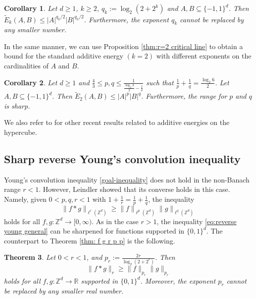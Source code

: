 \documentclass[reqno, 10pt]{amsart}
\theoremstyle{plain}
\numberwithin{equation}{section}
\newtheorem{theorem}{Theorem}[section]
\newtheorem{corollary}[theorem]{Corollary}
\theoremstyle{definition}
\newtheorem*{induction hypothesis}{Induction hypothesis}
\theoremstyle{remark}
\newcommand{\R}{\mathbb{R}}
\newcommand{\Z}{\mathbb{Z}}
\begin{document}
\begin{corollary}
    Let $d \geq 1$, $k \geq 2$, $q_k:=\log_2(2+2^k)$ and $A,B \subseteq \{-1,1\}^d$. Then $\widetilde{E}_k(A,B) \leq |A|^{q_k/2}|B|^{q_k/2}$. Furthermore, the exponent $q_k$ cannot be replaced by any smaller number.
\end{corollary}

In the same manner, we can use Proposition \ref{thm:r=2 critical line} to obtain a bound for the standard additive energy $(k=2)$ with different exponents on the cardinalities of $A$ and $B$.

\begin{corollary}\label{cor:additive k=2}
    Let $d \geq 1$ and $\frac{4}{3} \leq p, q \leq \frac{1}{\frac{\log_2 3}{2} - \frac{1}{4}}$ such that $\frac{1}{p}+\frac{1}{q}=\frac{\log_2 6}{2}$. Let $A,B \subseteq \{-1,1\}^d$. Then $\widetilde{E}_2(A,B) \leq |A|^{p}|B|^{q}$. Furthermore, the range for $p$ and $q$ is sharp.
\end{corollary}

We also refer to \cite{BCK} for other recent results related to additive energies on the hypercube.



\subsection{Sharp reverse Young's convolution inequality}

Young's convolution inequality \eqref{goal-inequality} does not hold in the non-Banach range $r<1$. However, Leindler \cite{Leindler} showed that its converse holds in this case. Namely, given $0<p,q, r < 1$ with $1+\frac{1}{r}=\frac{1}{p}+\frac{1}{q}$, the inequality
\begin{equation}\label{eq:reverse young general}
    \|f \ast g\|_{\ell^r(\Z^d)} \geq \|f\|_{\ell^p(\Z^d)} \|g\|_{\ell^q(\Z^d)}
\end{equation}
holds for all $f,g:\Z^d \to [0,\infty)$. As in the case $r>1$, the inequality \eqref{eq:reverse young general} can be sharpened for functions supported in $\{0,1\}^d$. The counterpart to Theorem \ref{thm: f g r p p} is the following. 

\begin{theorem}\label{thm: f g r p p reverse}
    Let $0 <r <  1$, and $p_r:=\frac{2r}{\log_2(2+2^r)}$. Then
\begin{equation}\label{rev-y01}
\|f*g\|_r\geq \|f\|_{p_r} \|g\|_{p_r}
\end{equation}
holds for all $f,g:\Z^d\to \R$ supported in $\{0,1\}^d$. Moreover, the exponent $p_r$ cannot be replaced by any smaller real number.
\end{theorem}
\end{document}
